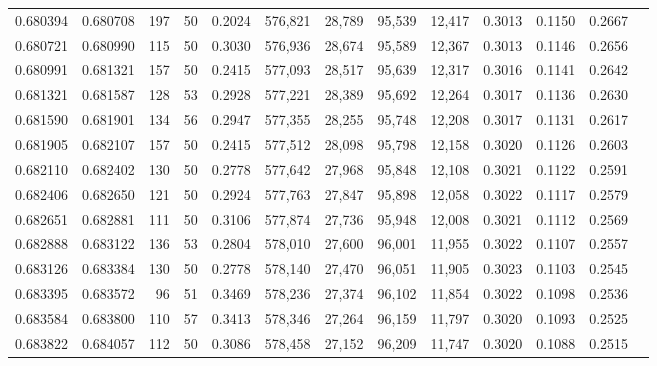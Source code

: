 \begin{tabular}{rrrrrrrrrrrrr}
0.680394 & 0.680708 &   197 &  50 &                                     0.2024 & 576,821 &  28,789 &  95,539 &  12,417 & 0.3013 & 0.1150 & 0.2667 \\
0.680721 & 0.680990 &   115 &  50 &                                     0.3030 & 576,936 &  28,674 &  95,589 &  12,367 & 0.3013 & 0.1146 & 0.2656 \\
0.680991 & 0.681321 &   157 &  50 &                                     0.2415 & 577,093 &  28,517 &  95,639 &  12,317 & 0.3016 & 0.1141 & 0.2642 \\
0.681321 & 0.681587 &   128 &  53 &                                     0.2928 & 577,221 &  28,389 &  95,692 &  12,264 & 0.3017 & 0.1136 & 0.2630 \\
0.681590 & 0.681901 &   134 &  56 &                                     0.2947 & 577,355 &  28,255 &  95,748 &  12,208 & 0.3017 & 0.1131 & 0.2617 \\
0.681905 & 0.682107 &   157 &  50 &                                     0.2415 & 577,512 &  28,098 &  95,798 &  12,158 & 0.3020 & 0.1126 & 0.2603 \\
0.682110 & 0.682402 &   130 &  50 &                                     0.2778 & 577,642 &  27,968 &  95,848 &  12,108 & 0.3021 & 0.1122 & 0.2591 \\
0.682406 & 0.682650 &   121 &  50 &                                     0.2924 & 577,763 &  27,847 &  95,898 &  12,058 & 0.3022 & 0.1117 & 0.2579 \\
0.682651 & 0.682881 &   111 &  50 &                                     0.3106 & 577,874 &  27,736 &  95,948 &  12,008 & 0.3021 & 0.1112 & 0.2569 \\
0.682888 & 0.683122 &   136 &  53 &                                     0.2804 & 578,010 &  27,600 &  96,001 &  11,955 & 0.3022 & 0.1107 & 0.2557 \\
0.683126 & 0.683384 &   130 &  50 &                                     0.2778 & 578,140 &  27,470 &  96,051 &  11,905 & 0.3023 & 0.1103 & 0.2545 \\
0.683395 & 0.683572 &    96 &  51 &                                     0.3469 & 578,236 &  27,374 &  96,102 &  11,854 & 0.3022 & 0.1098 & 0.2536 \\
0.683584 & 0.683800 &   110 &  57 &                                     0.3413 & 578,346 &  27,264 &  96,159 &  11,797 & 0.3020 & 0.1093 & 0.2525 \\
0.683822 & 0.684057 &   112 &  50 &                                     0.3086 & 578,458 &  27,152 &  96,209 &  11,747 & 0.3020 & 0.1088 & 0.2515 \\

\end{tabular}
